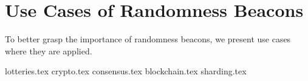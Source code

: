 \section{Use Cases of Randomness Beacons}\label{sec:use_cases_of_randomness_beacons}
To better grasp the importance of randomness beacons, we present use cases where they are applied.

{lotteries.tex}
{crypto.tex}
{consensus.tex}
{blockchain.tex}
{sharding.tex}
